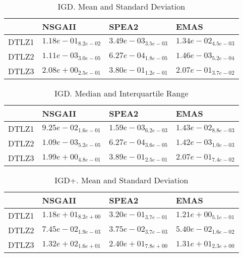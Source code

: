\documentclass{article}
\begin{document}
\begin{table}
\caption{IGD. Mean and Standard Deviation}
\label{table: IGD}
\centering
\begin{scriptsize}
\begin{tabular}{llll}
\hline & NSGAII & SPEA2 &  EMAS\\
\hline 
DTLZ1 & $  1.18e-01_{ 8.2e-02}$ & \cellcolor{gray95}$  3.49e-03_{ 3.5e-03}$ & \cellcolor{gray25}$  1.34e-02_{ 4.5e-03}$ \\
DTLZ2 & \cellcolor{gray25}$  1.11e-03_{ 3.0e-05}$ & \cellcolor{gray95}$  6.27e-04_{ 1.8e-05}$ & $  1.46e-03_{ 5.2e-04}$ \\
DTLZ3 & $  2.08e+00_{ 2.5e-01}$ & \cellcolor{gray25}$  3.80e-01_{ 1.2e-01}$ & \cellcolor{gray95}$  2.07e-01_{ 3.7e-02}$ \\
\hline
\end{tabular}
\end{scriptsize}
\end{table}

\begin{table}
\caption{IGD. Median and Interquartile Range}
\label{table: IGD}
\centering
\begin{scriptsize}
\begin{tabular}{llll}
\hline & NSGAII & SPEA2 &  EMAS\\
\hline 
DTLZ1 & $  9.25e-02_{ 1.6e-01}$ & \cellcolor{gray95}$  1.59e-03_{ 6.2e-03}$ & \cellcolor{gray25}$  1.43e-02_{ 8.8e-03}$ \\
DTLZ2 & \cellcolor{gray25}$  1.09e-03_{ 5.2e-05}$ & \cellcolor{gray95}$  6.27e-04_{ 3.6e-05}$ & $  1.42e-03_{ 1.0e-03}$ \\
DTLZ3 & $  1.99e+00_{ 4.8e-01}$ & \cellcolor{gray25}$  3.89e-01_{ 2.5e-01}$ & \cellcolor{gray95}$  2.07e-01_{ 7.4e-02}$ \\
\hline
\end{tabular}
\end{scriptsize}
\end{table}

\begin{table}
\caption{IGD+. Mean and Standard Deviation}
\label{table: IGD+}
\centering
\begin{scriptsize}
\begin{tabular}{llll}
\hline & NSGAII & SPEA2 &  EMAS\\
\hline 
DTLZ1 & $  1.18e+01_{ 8.2e+00}$ & \cellcolor{gray95}$  3.20e-01_{ 3.7e-01}$ & \cellcolor{gray25}$  1.21e+00_{ 5.1e-01}$ \\
DTLZ2 & $  7.45e-02_{ 1.9e-03}$ & \cellcolor{gray95}$  3.75e-02_{ 3.7e-03}$ & \cellcolor{gray25}$  5.40e-02_{ 1.6e-02}$ \\
DTLZ3 & $  1.32e+02_{ 1.6e+01}$ & \cellcolor{gray25}$  2.40e+01_{ 7.8e+00}$ & \cellcolor{gray95}$  1.31e+01_{ 2.3e+00}$ \\
\hline
\end{tabular}
\end{scriptsize}
\end{table}
\end{document}
